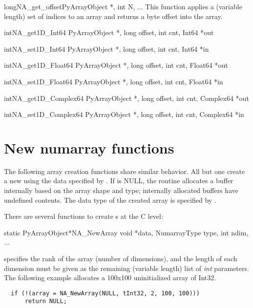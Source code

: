 \begin{cfuncdesc}{long}{NA_get_offset}{PyArrayObject *, int N, ...}
   This function applies a (variable length) set of  indices to an array
   and returns a byte offset into the array.
\end{cfuncdesc}

\begin{cfuncdesc}{int}{NA_get1D_Int64}{%
      PyArrayObject *, long offset, int cnt, Int64 *out}%
\end{cfuncdesc}

\begin{cfuncdesc}{int}{NA_set1D_Int64}{%
      PyArrayObject *, long offset, int cnt, Int64 *in}%
\end{cfuncdesc}

\begin{cfuncdesc}{int}{NA_get1D_Float64}{%
      PyArrayObject *, long offset, int cnt, Float64 *out}%
\end{cfuncdesc}

\begin{cfuncdesc}{int}{NA_set1D_Float64}{%
      PyArrayObject *, long offset, int cnt, Float64 *in}%
\end{cfuncdesc}

\begin{cfuncdesc}{int}{NA_get1D_Complex64}{%
      PyArrayObject *, long offset, int cnt, Complex64 *out}%
\end{cfuncdesc}

\begin{cfuncdesc}{int}{NA_set1D_Complex64}{%
      PyArrayObject *, long offset, int cnt, Complex64 *in}%
\end{cfuncdesc}

\section{New numarray functions}
\label{sec:C-API:new-numarray-functions}

The following array creation functions share similar behavior.  All but one
create a new  using the data specified by .  If
 is NULL, the routine allocates a buffer internally based on the
array shape and type; internally allocated buffers have undefined contents.
The data type of the created array is specified by .

There are several functions to create s at the C level:

\begin{cfuncdesc}{static PyArrayObject*}{NA_NewArray}{%
    void *data, NumarrayType type, int ndim, ...}%

   specifies the rank of the array (number of dimensions), and the
  length of each dimension must be given as the remaining (variable length)
  list of \emph{int} parameters.  The following example allocates a 100x100
  uninitialized array of Int32.
\begin{verbatim}
  if (!(array = NA_NewArray(NULL, tInt32, 2, 100, 100)))
      return NULL;
\end{verbatim}
\end{cfuncdesc}

